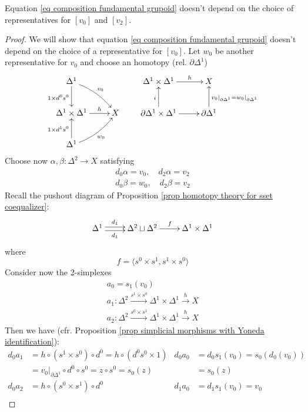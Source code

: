 \begin{refsection}
\begin{lemma}
Equation \eqref{eq composition fundamental grupoid} doesn't depend on the choice of representatives for $[v_0]$ and $[v_2]$.
\end{lemma}

\begin{proof}
We will show that equation \ref{eq composition fundamental grupoid} doesn't depend on the choice of a representative for $[v_0]$. Let $w_0$ be another representative for $v_0$ and choose an homotopy ($\text{rel. } \partial \Delta^1$)
\[
\xymatrix{
\Delta^1 \ar[d]_{1 \times d^0 s^0} \ar@/^.5pc/[dr]^{v_0} \\ \Delta^1 \times \Delta^1 \ar[r]^-h & X \\ \Delta^1 \ar[u]^{1 \times d^1 s^0} \ar@/_.5pc/[ur]_{w_0}
} \qquad
\xymatrix{
\Delta^1 \times \Delta^1 \ar[r]^-h & X \\ \partial \Delta^1 \times \Delta^1 \ar[u]^i \ar[r] & \partial \Delta^1 \ar[u]_{v_0 |_{\partial \Delta^1} = w_0 |_{\partial \Delta^1}}
}
\]
Choose now $\alpha,\beta \colon \Delta^2 \to X$ satisfying
\begin{gather*}
d_0 \alpha = v_0, \quad d_2 \alpha = v_2 \\
d_0 \beta = w_0, \quad d_2 \beta = v_2
\end{gather*}
Recall the pushout diagram of Proposition \ref{prop homotopy theory for sset coequalizer}:
\[
\xymatrix{
\Delta^1 \ar@<.5ex>[r]^-{d_1} \ar@<-.5ex>[r]_-{d_1} & \Delta^2 \sqcup \Delta^2 \ar[r]^f & \Delta^1 \times \Delta^1
}
\]
where
\[
f = \langle s^0 \times s^1, s^1 \times s^0 \rangle
\]
Consider now the 2-simplexes
\begin{gather*}
a_0 = s_1(v_0) \\
a_1 \colon \Delta^2 \xrightarrow{s^1 \times s^0} \Delta^1 \times \Delta^1 \xrightarrow{h} X \\
a_2 \colon \Delta^2 \xrightarrow{s^0 \times s^1} \Delta^1 \times \Delta^1 \xrightarrow{h} X
\end{gather*}
Then we have (cfr. Proposition \ref{prop simplicial morphisms with Yoneda identification}):
\begin{align*}
d_0 a_1 & = h \circ (s^1 \times s^0) \circ d^0 = h \circ (d^0 s^0 \times 1) & d_0 a_0 & = d_0 s_1 (v_0) = s_0(d_0(v_0)) \\
& = v_0 |_{\partial \Delta^1} \circ d^0 \circ s^0 = z \circ s^0 = s_0(z) & & = s_0(z) \\
d_0 a_2 & = h \circ (s^0 \times s^1) \circ d^0 & d_1 a_0 & = d_1 s_1(v_0) = v_0 \\

\end{align*}
\end{proof}
\end{refsection}
